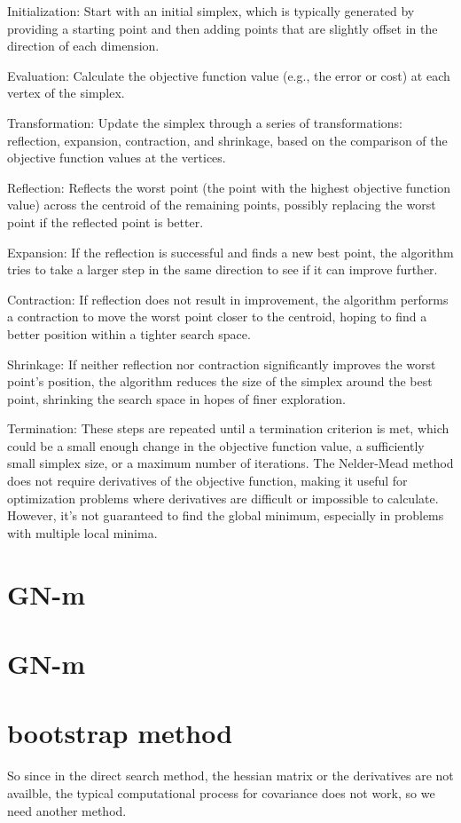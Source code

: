 \documentclass[17pt]{extarticle} %
\begin{document}
Initialization: Start with an initial simplex, which is typically generated by providing a starting point and then adding points that are slightly offset in the direction of each dimension.

Evaluation: Calculate the objective function value (e.g., the error or cost) at each vertex of the simplex.

Transformation: Update the simplex through a series of transformations: reflection, expansion, contraction, and shrinkage, based on the comparison of the objective function values at the vertices.

Reflection: Reflects the worst point (the point with the highest objective function value) across the centroid of the remaining points, possibly replacing the worst point if the reflected point is better.

Expansion: If the reflection is successful and finds a new best point, the algorithm tries to take a larger step in the same direction to see if it can improve further.

Contraction: If reflection does not result in improvement, the algorithm performs a contraction to move the worst point closer to the centroid, hoping to find a better position within a tighter search space.

Shrinkage: If neither reflection nor contraction significantly improves the worst point's position, the algorithm reduces the size of the simplex around the best point, shrinking the search space in hopes of finer exploration.

Termination: These steps are repeated until a termination criterion is met, which could be a small enough change in the objective function value, a sufficiently small simplex size, or a maximum number of iterations.
The Nelder-Mead method does not require derivatives of the objective function, making it useful for optimization problems where derivatives are difficult or impossible to calculate. However, it's not guaranteed to find the global minimum, especially in problems with multiple local minima.

\section*{GN-m}
\section*{GN-m}


\section*{bootstrap method}
So since in the direct search method, the hessian matrix or the derivatives are not availble, the typical computational process for covariance does not work, so we need another method.
\end{document}
